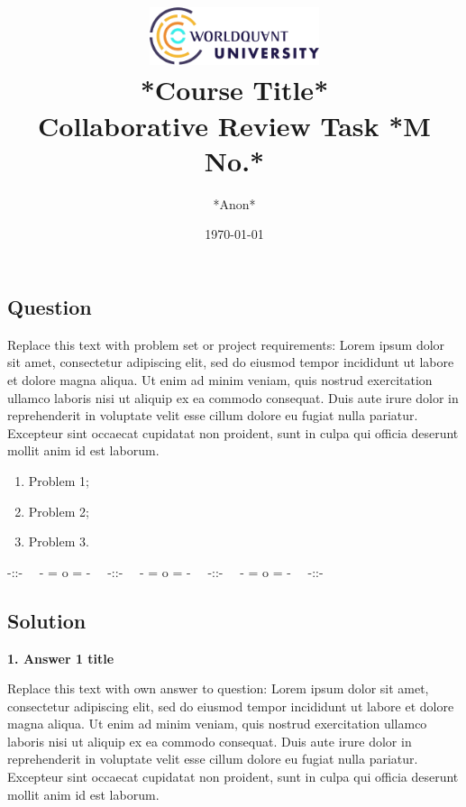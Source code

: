 \documentclass[a4paper, 11pt]{article}
\title{
    \includegraphics[width=5cm]{wqu_logo.png} \\ 
    \vspace{0.3cm} *Course Title* \\ 
    \vspace{0.3cm} Collaborative Review Task *M No.*
}
\author{*Anon*}  %
\date{\today}
\begin{document}
\maketitle  %


\footnotesize
\slshape
\subsection*{Question}

Replace this text with problem set or project requirements: Lorem ipsum dolor sit amet, consectetur adipiscing elit, sed do eiusmod tempor incididunt ut labore et dolore magna aliqua. Ut enim ad minim veniam, quis nostrud exercitation ullamco laboris nisi ut aliquip ex ea commodo consequat. Duis aute irure dolor in reprehenderit in voluptate velit esse cillum dolore eu fugiat nulla pariatur. Excepteur sint occaecat cupidatat non proident, sunt in culpa qui officia deserunt mollit anim id est laborum.

\begin{enumerate}
    \item Problem 1;
    \item Problem 2;
    \item Problem 3.
\end{enumerate}


\medskip
\begin{center} -::- \ \ - = o = - \ \ -::- \ \ - = o = - \ \ -::- \ \ - = o = - \ \ -::- \end{center}

\normalsize
\normalfont
\subsection*{Solution}

\textbf{1. Answer 1 title}  %

Replace this text with own answer to question: Lorem ipsum dolor sit amet, consectetur adipiscing elit, sed do eiusmod tempor incididunt ut labore et dolore magna aliqua. Ut enim ad minim veniam, quis nostrud exercitation ullamco laboris nisi ut aliquip ex ea commodo consequat. Duis aute irure dolor in reprehenderit in voluptate velit esse cillum dolore eu fugiat nulla pariatur. Excepteur sint occaecat cupidatat non proident, sunt in culpa qui officia deserunt mollit anim id est laborum.
\end{document}
